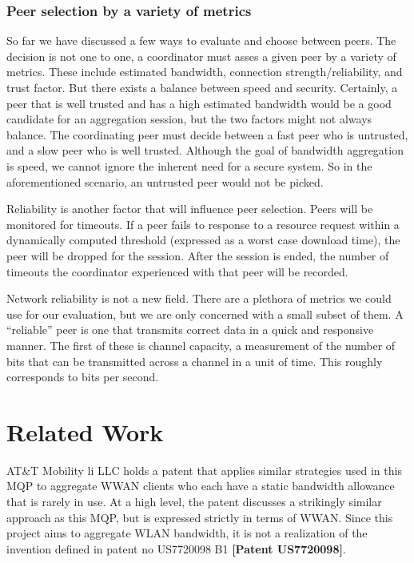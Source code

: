 \documentclass[12pt]{article}
\newcommand{\lcite}[1]
{{\bfseries\color{orange}[#1]}}
\begin{document}
		\subsubsection{Peer selection by a variety of metrics}

			So far we have discussed a few ways to evaluate and choose between peers. The decision is not one to one, a coordinator must asses a given peer by a variety of metrics. These include estimated bandwidth, connection strength/reliability, and trust factor. But there exists a balance between speed and security. Certainly, a peer that is well trusted and has a high estimated bandwidth would be a good candidate for an aggregation session, but the two factors might not always balance. The coordinating peer must decide between a fast peer who is untrusted, and a slow peer who is well trusted. Although the goal of bandwidth aggregation is speed, we cannot ignore the inherent need for a secure system. So in the aforementioned scenario, an untrusted peer would not be picked.

			Reliability is another factor that will influence peer selection. Peers will be monitored for timeouts. If a peer fails to response to a resource request within a dynamically computed threshold (expressed as a worst case download time), the peer will be dropped for the session. After the session is ended, the number of timeouts the coordinator experienced with that peer will be recorded. 

			Network reliability is not a new field. There are a plethora of metrics we could use for our evaluation, but we are only concerned with a small subset of them. A ``reliable'' peer is one that transmits correct data in a quick and responsive manner. The first of these is channel capacity, a measurement of the number of bits that can be transmitted across a channel in a unit of time. This roughly corresponds to bits per second. 



\newpage
\section{Related Work}

		AT\&T Mobility li LLC holds a patent that applies similar strategies used in this MQP to aggregate WWAN clients who each have a static bandwidth allowance that is rarely in use. At a high level, the patent discusses a strikingly similar approach as this MQP, but is expressed strictly in terms of WWAN. Since this project aims to aggregate WLAN bandwidth, it is not a realization of the invention defined in patent no US7720098 B1 \lcite{Patent US7720098}.
		
\end{document}
